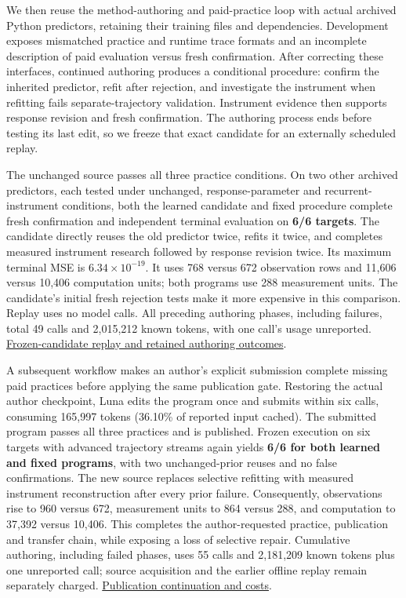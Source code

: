 \documentclass[twoside,11pt]{article}
\begin{document}
We then reuse the method-authoring and paid-practice loop with actual archived
Python predictors, retaining their training files and dependencies. Development
exposes mismatched practice and runtime trace formats and an incomplete description
of paid evaluation versus fresh confirmation. After correcting these interfaces,
continued authoring produces a conditional procedure: confirm the inherited
predictor, refit after rejection, and investigate the instrument when refitting
fails separate-trajectory validation. Instrument evidence then supports response
revision and fresh confirmation. The authoring process ends before testing its
last edit, so we freeze that exact candidate for an externally scheduled replay.


The unchanged source passes all three practice conditions. On two other archived
predictors, each tested under unchanged, response-parameter and recurrent-instrument
conditions, both the learned candidate and fixed procedure complete fresh
confirmation and independent terminal evaluation on \textbf{6/6 targets}. The candidate
directly reuses the old predictor twice, refits it twice, and completes measured
instrument research followed by response revision twice. Its maximum terminal
MSE is \(6.34\times10^{-19}\). It uses 768 versus 672 observation rows and 11,606
versus 10,406 computation units; both programs use 288 measurement units. The
candidate's initial fresh rejection tests make it more expensive in this comparison.
Replay uses no model calls. All preceding authoring phases, including failures,
total 49 calls and 2,015,212 known tokens, with one call's usage unreported.
\hyperlink{artifact-87}{Frozen-candidate replay and retained authoring outcomes}.


A subsequent workflow makes an author's explicit submission complete missing paid
practices before applying the same publication gate. Restoring the actual author
checkpoint, Luna edits the program once and submits within six calls, consuming
165,997 tokens (36.10\% of reported input cached). The submitted program passes all
three practices and is published. Frozen execution on six targets with advanced
trajectory streams again yields \textbf{6/6 for both learned and fixed programs}, with
two unchanged-prior reuses and no false confirmations. The new source replaces
selective refitting with measured instrument reconstruction after every prior
failure. Consequently, observations rise to 960 versus 672, measurement units to
864 versus 288, and computation to 37,392 versus 10,406. This completes the
author-requested practice, publication and transfer chain, while exposing a loss
of selective repair. Cumulative authoring, including failed phases, uses 55 calls
and 2,181,209 known tokens plus one unreported call; source acquisition and the
earlier offline replay remain separately charged.
\hyperlink{artifact-88}{Publication continuation and costs}.
\end{document}
